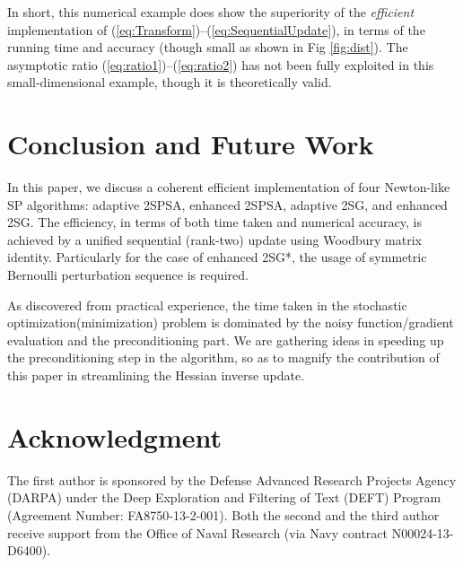 \documentclass[conference,10.3cpt]{IEEEtran}
\begin{document}
In short, this numerical example does show the superiority of the \textit{efficient} implementation of (\ref{eq:Transform})--(\ref{eq:SequentialUpdate}), in terms of the running time and accuracy (though small as shown in Fig \ref{fig:dist}). The asymptotic ratio (\ref{eq:ratio1})--(\ref{eq:ratio2}) has not been fully exploited in this small-dimensional example, though it is theoretically valid.


\section{Conclusion and Future Work} In this paper, we discuss
a coherent efficient implementation of four Newton-like SP algorithms:
adaptive 2SPSA, enhanced 2SPSA, adaptive 2SG, and enhanced 2SG. The
efficiency, in terms of both time taken and numerical accuracy, is
achieved by a unified sequential (rank-two) update using Woodbury
matrix identity. Particularly for the case of enhanced 2SG*, the
usage of symmetric Bernoulli perturbation sequence is required.

As discovered from practical experience, the time taken in the
stochastic optimization(minimization) problem is dominated by the
noisy function/gradient evaluation and the preconditioning part. We
are gathering ideas in speeding up the preconditioning step in the
algorithm, so as to magnify the contribution of this paper in
streamlining the Hessian inverse update.

\section*{Acknowledgment} The first author is sponsored by the
Defense Advanced Research Projects Agency (DARPA) under the Deep
Exploration and Filtering of Text (DEFT) Program (Agreement Number:
FA8750-13-2-001). Both the second and the third author receive
support from the Office of Naval Research (via Navy contract
N00024-13-D6400).
\end{document}
